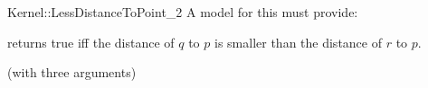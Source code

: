 \begin{ccRefFunctionObjectConcept}{Kernel::LessDistanceToPoint_2}
A model for this must provide:


{returns true iff the distance of $q$ to $p$ is
smaller than the distance of $r$ to $p$.}

\ccRefines
{} (with three arguments)

\ccSeeAlso
{}\\

\end{ccRefFunctionObjectConcept}

